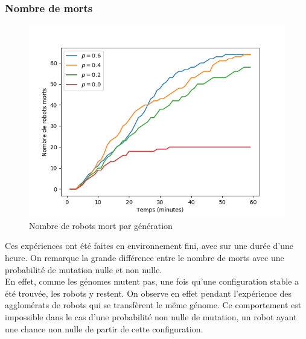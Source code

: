 \documentclass[a4paper]{article}
\begin{document}
\subsubsection{Nombre de morts}
\begin{figure}[h]
	\centering
	\begin{minipage}[c]{.46\linewidth}
		\centering
		\includegraphics[width=1.1\linewidth]{../../script_results/mEDEA_1_with_0.png}
		\caption{Nombre de robots mort par génération}
	\end{minipage}
\end{figure}
Ces expériences ont été faites en environnement fini, avec sur une durée d'une heure. On remarque la grande différence entre le nombre de morts avec une probabilité de mutation nulle et non nulle.\\
En effet, comme les génomes mutent pas, une fois qu'une configuration stable a été trouvée, les robots y restent. On observe en effet pendant l'expérience des agglomérats de robots qui se transfèrent le même génome. Ce comportement est impossible dans le cas d'une probabilité non nulle de mutation, un robot ayant une chance non nulle de partir de cette configuration.
\end{document}
